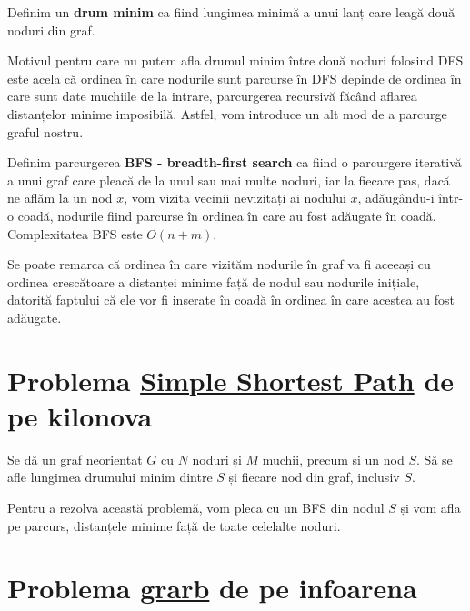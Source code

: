 \begin{definition}
    Definim un \textbf{drum minim} ca fiind lungimea minimă a unui lanț care leagă două noduri din graf.
\end{definition}

Motivul pentru care nu putem afla drumul minim între două noduri folosind DFS este acela că ordinea în care nodurile sunt parcurse în DFS depinde de ordinea în care sunt date muchiile de la intrare, parcurgerea recursivă făcând aflarea distanțelor minime imposibilă. Astfel, vom introduce un alt mod de a parcurge graful nostru.

\begin{definition}
    Definim parcurgerea \textbf{BFS - breadth-first search} ca fiind o parcurgere iterativă a unui graf care pleacă de la unul sau mai multe noduri, iar la fiecare pas, dacă ne aflăm la un nod $x$, vom vizita vecinii nevizitați ai nodului $x$, adăugându-i într-o coadă, nodurile fiind parcurse în ordinea în care au fost adăugate în coadă. Complexitatea BFS este $O(n + m)$.
\end{definition}

\begin{observation}
    Se poate remarca că ordinea în care vizităm nodurile în graf va fi aceeași cu ordinea crescătoare a distanței minime față de nodul sau nodurile inițiale, datorită faptului că ele vor fi inserate în coadă în ordinea în care acestea au fost adăugate. 
\end{observation}

\section{Problema \href{https://kilonova.ro/problems/2037}{Simple Shortest Path} de pe kilonova}

Se dă un graf neorientat $G$ cu $N$ noduri și $M$ muchii, precum și un nod $S$. Să se afle lungimea drumului minim dintre $S$ și fiecare nod din graf, inclusiv $S$.

Pentru a rezolva această problemă, vom pleca cu un BFS din nodul $S$ și vom afla pe parcurs, distanțele minime față de toate celelalte noduri. 


\section{Problema \href{https://www.infoarena.ro/problema/grarb}{grarb} de pe infoarena}

